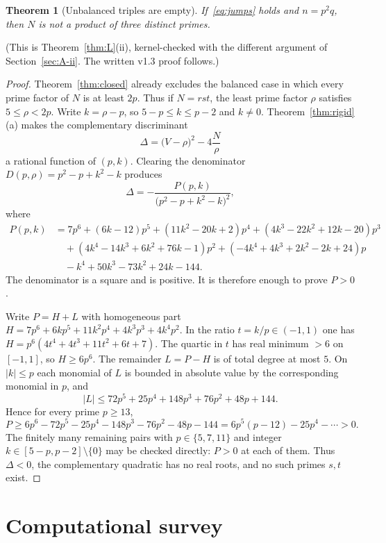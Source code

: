 \documentclass[11pt,reqno]{amsart}
\newtheorem{theorem}{Theorem}
\theoremstyle{definition}
\begin{document}
\begin{theorem}[Unbalanced triples are empty]
\label{thm:R1}
If~\eqref{eq:jumps} holds and \(n=p^2q\), then \(N\) is not a product of three distinct primes.
\end{theorem}

\noindent(This is Theorem~\ref{thm:L}(ii), kernel-checked with the different argument of Section~\ref{sec:A-ii}. The written v1.3 proof follows.)

\begin{proof}
Theorem~\ref{thm:closed} already excludes the balanced case in which every prime factor of \(N\) is at least \(2p\). Thus if \(N=rst\), the least prime factor \(\rho\) satisfies \(5\le\rho<2p\). Write \(k=\rho-p\), so \(5-p\le k\le p-2\) and \(k\neq 0\). Theorem~\ref{thm:rigid}(a) makes the complementary discriminant
\[
\Delta=\bigl(V-\rho\bigr)^2-4\frac{N}{\rho}
\]
a rational function of \((p,k)\). Clearing the denominator \(D(p,\rho)=p^2-p+k^2-k\) produces
\[
\Delta=-\frac{P(p,k)}{\bigl(p^2-p+k^2-k\bigr)^2},
\]
where
\begin{align*}
P(p,k)&=7p^6+(6k-12)p^5+(11k^2-20k+2)p^4+(4k^3-22k^2+12k-20)p^3\\
&\quad+(4k^4-14k^3+6k^2+76k-1)p^2+(-4k^4+4k^3+2k^2-2k+24)p\\
&\quad-k^4+50k^3-73k^2+24k-144.
\end{align*}
The denominator is a square and is positive. It is therefore enough to prove \(P>0\).

Write \(P=H+L\) with homogeneous part \(H=7p^6+6kp^5+11k^2p^4+4k^3p^3+4k^4p^2\). In the ratio \(t=k/p\in(-1,1)\) one has \(H=p^6(4t^4+4t^3+11t^2+6t+7)\). The quartic in \(t\) has real minimum \(>6\) on \([-1,1]\), so \(H\ge 6p^6\). The remainder \(L=P-H\) is of total degree at most \(5\). On \(|k|\le p\) each monomial of \(L\) is bounded in absolute value by the corresponding monomial in \(p\), and
\[
|L|\le 72p^5+25p^4+148p^3+76p^2+48p+144.
\]
Hence for every prime \(p\ge 13\),
\[
P\ge 6p^6-72p^5-25p^4-148p^3-76p^2-48p-144=6p^5(p-12)-25p^4-\cdots>0.
\]
The finitely many remaining pairs with \(p\in\{5,7,11\}\) and integer \(k\in[5-p,p-2]\setminus\{0\}\) may be checked directly: \(P>0\) at each of them. Thus \(\Delta<0\), the complementary quadratic has no real roots, and no such primes \(s,t\) exist.
\end{proof}

\section{Computational survey}
\end{document}
